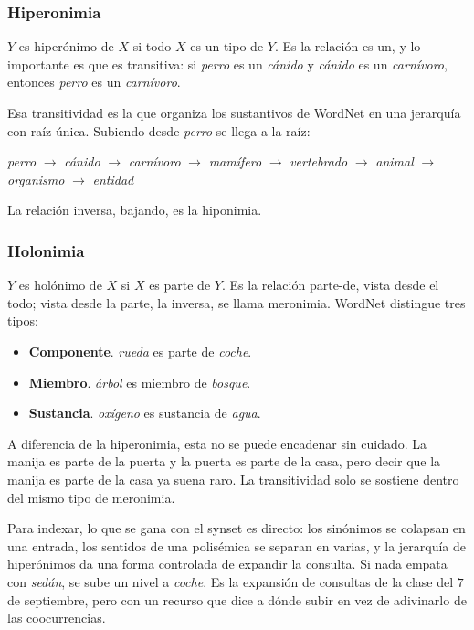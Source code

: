 \documentclass[11pt,letterpaper]{article}
\begin{document}
\subsubsection*{Hiperonimia}

$Y$ es hiperónimo de $X$ si todo $X$ es un tipo de $Y$. Es la
relación es-un, y lo importante es que es transitiva: si
\textit{perro} es un \textit{cánido} y \textit{cánido} es un
\textit{carnívoro}, entonces \textit{perro} es un \textit{carnívoro}.

Esa transitividad es la que organiza los sustantivos de WordNet en
una jerarquía con raíz única. Subiendo desde \textit{perro} se llega
a la raíz:

\begin{center}
    \textit{perro} $\to$ \textit{cánido} $\to$ \textit{carnívoro}
    $\to$ \textit{mamífero} $\to$ \textit{vertebrado} $\to$
    \textit{animal} $\to$ \textit{organismo} $\to$ \textit{entidad}
\end{center}

La relación inversa, bajando, es la hiponimia.

\subsubsection*{Holonimia}

$Y$ es holónimo de $X$ si $X$ es parte de $Y$. Es la relación
parte-de, vista desde el todo; vista desde la parte, la inversa, se
llama meronimia. WordNet distingue tres tipos:

\begin{itemize}[itemsep=0.2em]
    \item \textbf{Componente}. \textit{rueda} es parte de
          \textit{coche}.
    \item \textbf{Miembro}. \textit{árbol} es miembro de
          \textit{bosque}.
    \item \textbf{Sustancia}. \textit{oxígeno} es sustancia de
          \textit{agua}.
\end{itemize}

\begin{ojo}
    A diferencia de la hiperonimia, esta no se puede encadenar sin
    cuidado. La manija es parte de la puerta y la puerta es parte de
    la casa, pero decir que la manija es parte de la casa ya suena
    raro. La transitividad solo se sostiene dentro del mismo tipo de
    meronimia.
\end{ojo}

\begin{idea}
    Para indexar, lo que se gana con el synset es directo: los
    sinónimos se colapsan en una entrada, los sentidos de una
    polisémica se separan en varias, y la jerarquía de hiperónimos
    da una forma controlada de expandir la consulta. Si nada empata
    con \textit{sedán}, se sube un nivel a \textit{coche}. Es la
    expansión de consultas de la clase del $7$ de septiembre, pero
    con un recurso que dice a dónde subir en vez de adivinarlo de las
    coocurrencias.
\end{idea}
\end{document}
